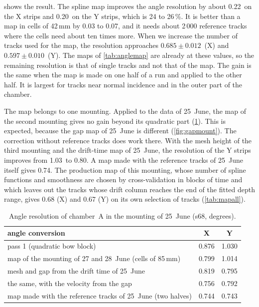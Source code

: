  shows the result. The spline map improves the angle resolution by about 0.22\textdegree\ on the
X strips and 0.20\textdegree\ on the Y strips, which is 24 to 26\,\%. It is better than a map in cells of 42\,mm by
0.03 to 0.07\textdegree, and it needs about 2\,000 reference tracks where the cells need about ten times more. When we
increase the number of tracks used for the map, the resolution approaches $0.685\pm0.012$\textdegree\ (X) and
$0.597\pm0.010$\textdegree\ (Y). The maps of \cref{tab:anglemap} are already at these values, so the remaining
resolution is that of single tracks and not that of the map. The gain is the same when the map is made on one half of
a run and applied to the other half. It is largest for tracks near normal incidence and in the outer part of the
chamber.

The map belongs to one mounting. Applied to the data of 25~June, the map of the second mounting gives no gain beyond
its quadratic part (\cref{tab:anglemount}). This is expected, because the gap map of 25~June is different
(\cref{fig:gapmount}). The correction without reference tracks does work there. With the mesh height of the third
mounting and the drift-time map of 25~June, the resolution of the Y strips improves from 1.03\textdegree\ to
0.80\textdegree. A map made with the reference tracks of 25~June itself gives 0.74\textdegree. The production map of
this mounting, whose number of spline functions and smoothness are chosen by cross-validation in blocks of time and
which leaves out the tracks whose drift column reaches the end of the fitted depth range, gives 0.68\textdegree{} (X)
and 0.67\textdegree{} (Y) on its own selection of tracks (\cref{tab:mapall}).

\begin{table}[tbp]
  \centering
  \caption{Angle resolution of chamber~A in the mounting of 25~June (s68, degrees).}
  \label{tab:anglemount}
  \begin{tabular}{lcc}
    \hline
    angle conversion & X & Y \\
    \hline
    pass 1 (quadratic bow block)                              & 0.876 & 1.030 \\
    map of the mounting of 27 and 28~June (cells of 85\,mm)   & 0.799 & 1.014 \\
    mesh and gap from the drift time of 25~June               & 0.819 & 0.795 \\
    the same, with the velocity from the gap                  & 0.756 & 0.792 \\
    map made with the reference tracks of 25~June (two halves) & 0.744 & 0.743 \\
    \hline
  \end{tabular}
\end{table}

